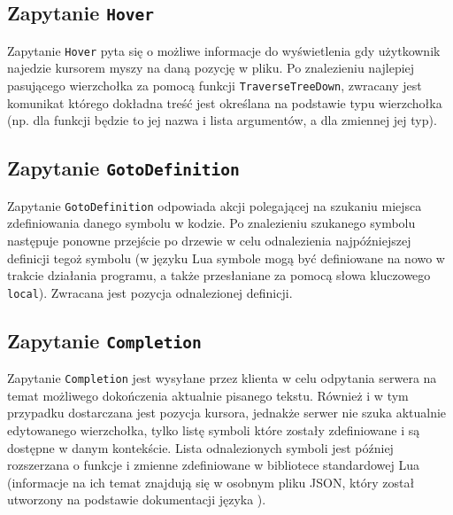 \subsection{Zapytanie \texttt{Hover}}
Zapytanie \texttt{Hover} pyta się o możliwe informacje do wyświetlenia gdy użytkownik najedzie kursorem myszy na daną pozycję w pliku. Po znalezieniu najlepiej pasującego wierzchołka za pomocą funkcji \texttt{TraverseTreeDown}, zwracany jest komunikat którego dokładna treść jest określana na podstawie typu wierzchołka (np. dla funkcji będzie to jej nazwa i lista argumentów, a dla zmiennej jej typ).

\subsection{Zapytanie \texttt{GotoDefinition}}
Zapytanie \texttt{GotoDefinition} odpowiada akcji polegającej na szukaniu miejsca zdefiniowania danego symbolu w kodzie. Po znalezieniu szukanego symbolu następuje ponowne przejście po drzewie w celu odnalezienia najpóźniejszej definicji tegoż symbolu (w języku Lua symbole mogą być definiowane na nowo w trakcie działania programu, a także przesłaniane za pomocą słowa kluczowego \texttt{local}). Zwracana jest pozycja odnalezionej definicji.

\subsection{Zapytanie \texttt{Completion}}
Zapytanie \texttt{Completion} jest wysyłane przez klienta w celu odpytania serwera na temat możliwego dokończenia aktualnie pisanego tekstu. Również i w tym przypadku dostarczana jest pozycja kursora, jednakże serwer nie szuka aktualnie edytowanego wierzchołka, tylko listę symboli które zostały zdefiniowane i są dostępne w danym kontekście. Lista odnalezionych symboli jest później rozszerzana o funkcje i zmienne zdefiniowane w bibliotece standardowej Lua (informacje na ich temat znajdują się w osobnym pliku JSON, który został utworzony na podstawie dokumentacji języka \cite{lua_lib}).